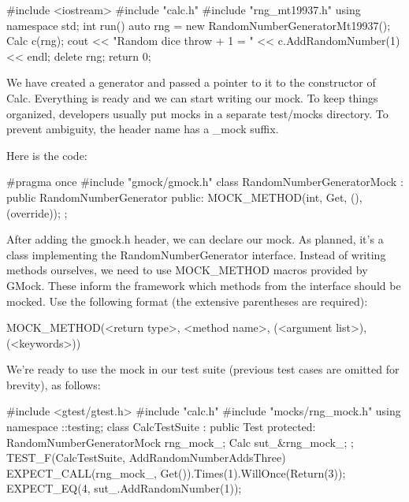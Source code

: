 
\begin{cpp}
#include <iostream>
#include "calc.h"
#include "rng_mt19937.h"
using namespace std;
int run() {
    auto rng = new RandomNumberGeneratorMt19937();
    Calc c(rng);
    cout << "Random dice throw + 1 = "
         << c.AddRandomNumber(1) << endl;
    delete rng;
    return 0;
}
\end{cpp}

We have created a generator and passed a pointer to it to the constructor of Calc. Everything is ready and we can start writing our mock. To keep things organized, developers usually put mocks in a separate test/mocks directory. To prevent ambiguity, the header name has a \_mock suffix.

Here is the code:


\begin{cpp}
#pragma once
#include "gmock/gmock.h"
class RandomNumberGeneratorMock : public
RandomNumberGenerator {
public:
    MOCK_METHOD(int, Get, (), (override));
};
\end{cpp}

After adding the gmock.h header, we can declare our mock. As planned, it’s a class implementing the RandomNumberGenerator interface. Instead of writing methods ourselves, we need to use MOCK\_METHOD macros provided by GMock. These inform the framework which methods from the interface should be mocked. Use the following format (the extensive parentheses are required):

\begin{shell}
MOCK_METHOD(<return type>, <method name>,
           (<argument list>), (<keywords>))
\end{shell}

We’re ready to use the mock in our test suite (previous test cases are omitted for brevity), as follows:


\begin{cpp}
#include <gtest/gtest.h>
#include "calc.h"
#include "mocks/rng_mock.h"
using namespace ::testing;
class CalcTestSuite : public Test {
protected:
    RandomNumberGeneratorMock rng_mock_;
    Calc sut_{&rng_mock_};
};
TEST_F(CalcTestSuite, AddRandomNumberAddsThree) {
    EXPECT_CALL(rng_mock_, Get()).Times(1).WillOnce(Return(3));
    EXPECT_EQ(4, sut_.AddRandomNumber(1));
}
\end{cpp}

